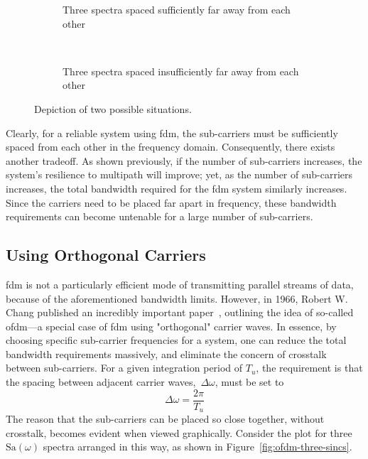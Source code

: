 \documentclass[class=report,11pt,crop=false]{standalone}
\begin{document}
\begin{figure}[htbp]
    \centering
    \captionsetup{type=figure}
    \begin{subfigure}[t]{0.58\textwidth}
        \centering
        \def\svgwidth{1\linewidth}
        { %
        \tiny
            }
        \caption{Three spectra spaced sufficiently far away from each other}
        \label{fig:three-sincs-good-distance}
    \end{subfigure}
    ~
    \begin{subfigure}[t]{0.4\textwidth}
        \centering
        \def\svgwidth{1\linewidth}
        { %
        \tiny
            }
        \caption{Three spectra spaced insufficiently far away from each other}
        \label{fig:three-sincs-bad-distance}
    \end{subfigure}%
    \caption{Depiction of two possible  situations.}
    \label{fig:three-sincs-good-and-bad}
\end{figure}

Clearly, for a reliable system using \gls{fdm}, the sub-carriers must be sufficiently spaced from each other in the frequency domain. Consequently, there exists another tradeoff. As shown previously, if the number of sub-carriers increases, the system's resilience to multipath will improve; yet, as the number of sub-carriers increases, the total bandwidth required for the \gls{fdm} system similarly increases. Since the carriers need to be placed far apart in frequency, these bandwidth requirements can become untenable for a large number of sub-carriers. 
  
\subsection{Using Orthogonal Carriers}
\gls{fdm} is not a particularly efficient mode of transmitting parallel streams of data, because of the aforementioned bandwidth limits. However, in 1966, Robert W. Chang published an incredibly important paper~\cite{Chang1966}, outlining the idea of so-called \gls{ofdm}---a special case of \gls{fdm} using "orthogonal" carrier waves. In essence, by choosing specific sub-carrier frequencies for a system, one can reduce the total bandwidth requirements massively, and eliminate the concern of crosstalk between sub-carriers. For a given integration period of \(T_u\), the requirement is that the spacing between adjacent carrier waves,~\(\Delta\omega\), must be set to
\begin{equation}
    \Delta \omega = \frac{2\pi}{T_u}
\end{equation}
The reason that the sub-carriers can be placed so close together, without crosstalk, becomes evident when viewed graphically. Consider the plot for three \(\mathrm{Sa}(\omega)\) spectra arranged in this way, as shown in Figure~\ref{fig:ofdm-three-sincs}.
\end{document}
